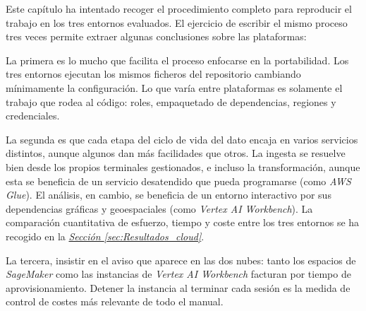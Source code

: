 Este capítulo ha intentado recoger el procedimiento completo para reproducir el trabajo en los tres entornos evaluados. El ejercicio de escribir el mismo proceso tres veces permite extraer algunas conclusiones sobre las plataformas:

La primera es lo mucho que facilita el proceso enfocarse en la portabilidad. Los tres entornos ejecutan los mismos ficheros del repositorio cambiando mínimamente la configuración. Lo que varía entre plataformas es solamente el trabajo que rodea al código: roles, empaquetado de dependencias, regiones y credenciales.

La segunda es que cada etapa del ciclo de vida del dato encaja en varios servicios distintos, aunque algunos dan más facilidades que otros. La ingesta se resuelve bien desde los propios terminales gestionados, e incluso la transformación, aunque esta se beneficia de un servicio desatendido que pueda programarse (como \textit{AWS Glue}). El análisis, en cambio, se beneficia de un entorno interactivo por sus dependencias gráficas y geoespaciales (como \textit{Vertex AI Workbench}). La comparación cuantitativa de esfuerzo, tiempo y coste entre los tres entornos se ha recogido en la \hyperref[sec:Resultados_cloud]{\textit{Sección \ref*{sec:Resultados_cloud}}}.

La tercera, insistir en el aviso que aparece en las dos nubes: tanto los espacios de \textit{SageMaker} como las instancias de \textit{Vertex AI Workbench} facturan por tiempo de aprovisionamiento. Detener la instancia al terminar cada sesión es la medida de control de costes más relevante de todo el manual.
